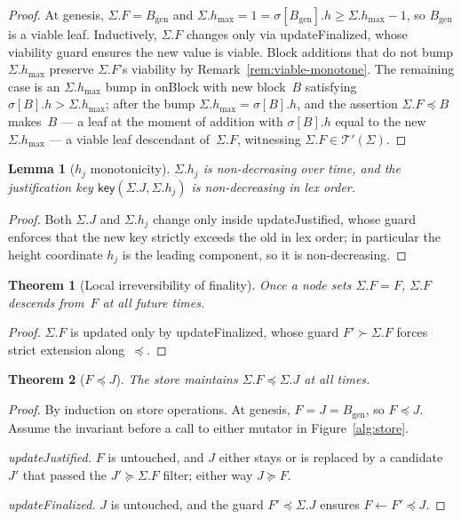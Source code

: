 \ifx\litemode\undefined\documentclass{article}\fi
\newcommand{\genesis}{\ensuremath{B_{\mathrm{gen}}}}
\newcommand{\hmax}{\ensuremath{h_{\max}}\xspace}
\newcommand{\viableTree}{\ensuremath{\mathcal{T}'}}
\newcommand{\onBlock}{\textsf{onBlock}\xspace}
\newcommand{\updateJustified}{\textsf{updateJustified}\xspace}
\newcommand{\updateFinalized}{\textsf{updateFinalized}\xspace}
\newcommand{\key}{\ensuremath{\mathsf{key}}}
\theoremstyle{plain}
\newtheorem{theorem}{Theorem}
\newtheorem{lemma}{Lemma}
\theoremstyle{definition}
\theoremstyle{remark}
\begin{document}
\begin{proof}
At genesis, $\Sigma.F = \genesis$ and $\Sigma.\hmax = 1 = \sigma[\genesis].h \geq \Sigma.\hmax - 1$, so $\genesis$ is a viable leaf.
Inductively, $\Sigma.F$ changes only via \updateFinalized, whose viability guard ensures the new value is viable.
Block additions that do not bump $\Sigma.\hmax$ preserve $\Sigma.F$'s viability by Remark~\ref{rem:viable-monotone}.
The remaining case is an $\Sigma.\hmax$ bump in \onBlock with new block~$B$ satisfying $\sigma[B].h > \Sigma.\hmax$; after the bump $\Sigma.\hmax = \sigma[B].h$, and the assertion $\Sigma.F \preceq B$ makes~$B$ --- a leaf at the moment of addition with $\sigma[B].h$ equal to the new $\Sigma.\hmax$ --- a viable leaf descendant of~$\Sigma.F$, witnessing $\Sigma.F \in \viableTree(\Sigma)$.
\end{proof}

\begin{lemma}[$h_j$ monotonicity]\label{lem:Rs-key-monotone}
$\Sigma.h_j$ is non-decreasing over time, and the justification key $\key(\Sigma.J, \Sigma.h_j)$ is non-decreasing in lex order.
\end{lemma}

\begin{proof}
Both $\Sigma.J$ and $\Sigma.h_j$ change only inside \updateJustified, whose guard enforces that the new key strictly exceeds the old in lex order; in particular the height coordinate $h_j$ is the leading component, so it is non-decreasing.
\end{proof}

\begin{theorem}[Local irreversibility of finality]\label{thm:finperm}
Once a node sets $\Sigma.F = F$, $\Sigma.F$ descends from~$F$ at all future times.
\end{theorem}

\begin{proof}
$\Sigma.F$ is updated only by \updateFinalized, whose guard $F' \succ \Sigma.F$ forces strict extension along~$\preceq$.
\end{proof}

\begin{theorem}[$F \preceq J$]\label{thm:fleqr}
The store maintains $\Sigma.F \preceq \Sigma.J$ at all times.
\end{theorem}

\begin{proof}
By induction on store operations.
At genesis, $F = J = \genesis$, so $F \preceq J$.
Assume the invariant before a call to either mutator in Figure~\ref{alg:store}.

\emph{\updateJustified.}
$F$ is untouched, and $J$ either stays or is replaced by a candidate~$J'$ that passed the $J' \succeq \Sigma.F$ filter; either way $J \succeq F$.

\emph{\updateFinalized.}
$J$ is untouched, and the guard $F' \preceq \Sigma.J$ ensures $F \gets F' \preceq J$.
\end{proof}
\end{document}
